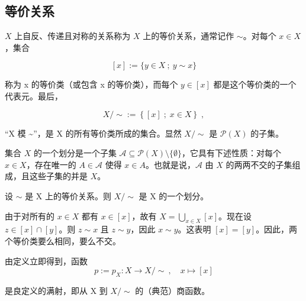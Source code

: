\subsection*{等价关系}

$X$ 上自反、传递且对称的关系称为 $X$ 上的等价关系，通常记作 $\sim$。对每个 $x \in X$，集合

\[
[x]:=\{y\in X~;~y\sim x\}
\]

称为 x 的等价类（或包含 x 的等价类），而每个  $ y \in [x] $ 都是这个等价类的一个代表元。最后，

\[
X/\sim:=\left\{[x]\;;\;x\in X\right\}\;,
\]

“X 模 \textasciitilde{}”，是 X 的所有等价类所成的集合。显然 $X/\sim$ 是 $\mathcal{P}(X)$ 的子集。

集合 $X$ 的一个划分是一个子集 $\mathcal{A} \subseteq \mathcal{P}(X) \setminus \{\emptyset\}$，它具有下述性质：对每个 $x \in X$，存在唯一的 $A \in \mathcal{A}$ 使得 $x \in A$。也就是说，$\mathcal{A}$ 由 $X$ 的两两不交的子集组成，且这些子集的并是 $X$。

\begin{proposition}

设  $ \sim $ 是 X 上的等价关系。则  $ X/\sim $ 是 X 的一个划分。

\proofhead
由于对所有的  $ x \in X $ 都有  $ x \in [x] $，故有  $ X = \bigcup_{x \in X}[x] $。现在设  $ z \in [x] \cap [y] $。则  $ z \sim x $ 且  $ z \sim y $，因此  $ x \sim y $。这表明  $ [x] = [y] $。因此，两个等价类要么相同，要么不交。

由定义立即得到，函数
\[
p:=p_{X}\colon X\to X/{\sim}~,\quad x\mapsto[x]
\]

是良定义的满射，即从 X 到  $ X/\sim $ 的（典范）商函数。

\end{proposition}


